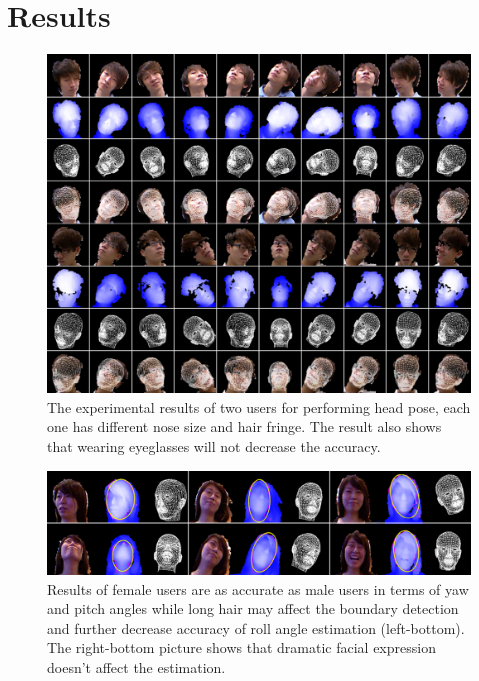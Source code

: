 \chapter{Results}
\label{c:result}

\begin{figure}
\includegraphics[width=1.0\linewidth]{./figure/m1_result.png}
\caption{The experimental results of two users for performing head pose, each one has different nose size and hair fringe. The result also shows that wearing eyeglasses will not decrease the accuracy.}
\label{f:m1 result}       %
\end{figure}


\begin{figure}
\includegraphics[width=1.0\linewidth]{./figure/m1_result_opal.png}
\caption{Results of female users are as accurate as male users in terms of yaw and pitch angles while long hair may affect the boundary detection and further decrease accuracy of roll angle estimation (left-bottom). The right-bottom picture shows that dramatic facial expression doesn’t affect the estimation.}
\label{f:m1 result girl}       %
\end{figure}

